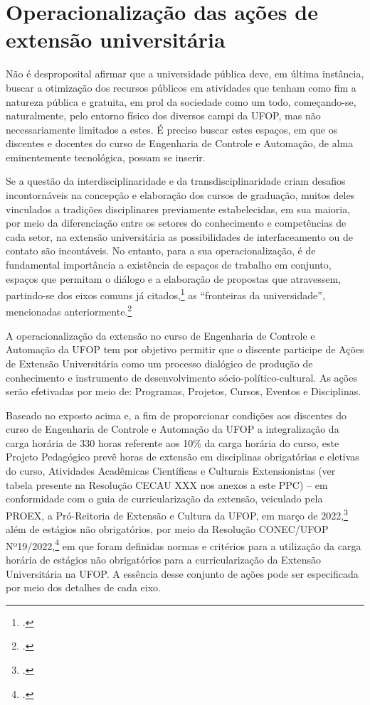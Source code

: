 \documentclass[
	12pt,				%
	openright,			%
	oneside,			%
	a4paper,			%
	english,			%
	brazil				%
	]{abntex2}
\begin{document}
\section{Operacionalização das ações de extensão universitária}
%
Não é desproposital afirmar que a universidade pública deve, em última instância, buscar a otimização dos recursos públicos em atividades que tenham como fim a natureza pública e gratuita, em prol da sociedade como um todo, começando-se, naturalmente, pelo entorno físico dos diversos campi da UFOP, mas não necessariamente limitados a estes. É preciso buscar estes espaços, em que os discentes e docentes do curso de Engenharia de Controle e Automação, de alma eminentemente tecnológica, possam se inserir.

Se a questão da interdisciplinaridade e da transdisciplinaridade criam desafios incontornáveis na concepção e elaboração dos cursos de graduação, muitos deles vinculados a tradições disciplinares previamente estabelecidas, em sua maioria, por meio da diferenciação entre os setores do conhecimento e competências de cada setor, na extensão universitária as possibilidades de interfaceamento ou de contato são incontáveis. No entanto, para a sua operacionalização, é de fundamental importância a existência de espaços de trabalho em conjunto, espaços que permitam o diálogo e a elaboração de propostas que atravessem, partindo-se dos eixos comuns já citados,\footcite[Ver, por exemplo, o capítulo 3 da política de formação para os cursos de engenharia, em que tais eixos são justamente especificados. ver em][p.~13]{politica-eng-2022-ufop} as ``fronteiras da universidade'', mencionadas anteriormente.\footcite[Ver também][]{varellaetal2022}

A operacionalização da extensão no curso de Engenharia de Controle e Automação da UFOP tem por objetivo permitir que o discente participe de Ações de Extensão Universitária como um processo dialógico de produção de conhecimento e instrumento de desenvolvimento sócio-político-cultural. As ações serão efetivadas por meio de: Programas, Projetos, Cursos, Eventos e Disciplinas.

Baseado no exposto acima e, a fim de proporcionar condições aos discentes do curso de Engenharia de Controle e Automação da UFOP a integralização da carga horária de 330 horas referente aos 10\% da carga horária do curso, este Projeto Pedagógico prevê horas de extensão em disciplinas obrigatórias e eletivas do curso, Atividades Acadêmicas Científicas e Culturais Extensionistas (ver tabela presente na Resolução CECAU XXX nos anexos a este PPC) -- em conformidade com o guia de curricularização da extensão, veiculado pela PROEX, a Pró-Reitoria de Extensão e Cultura da UFOP, em março de 2022,\footcite[Ver em][]{guia-curricularizacao-2022} além de estágios não obrigatórios, por meio da Resolução CONEC/UFOP Nº19/2022,\footcite{CONEC-UFOP-19-2022} em que foram definidas normas e critérios para a utilização da carga horária de estágios não obrigatórios para a curricularização da Extensão Universitária na UFOP. A essência desse conjunto de ações pode ser especificada por meio dos detalhes de cada eixo.
\end{document}
